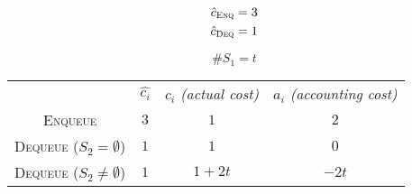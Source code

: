 \begin{frame}{}
  \centerline{}

  \begin{align*}
    \hat{c}_{\textsc{Enq}} &= 3 \\
    \hat{c}_{\textsc{Deq}} &= 1 \\
  \end{align*}

  \vspace{-0.60cm}
  \[
    \#S_1 = t
  \]

  \begin{table}
    \begin{tabular}{c|ccc}
      & $\hat{c_i}$ & $c_i$ {\it (actual cost)} & $a_i$ {\it (accounting cost)} \\
      \textsc{Enqueue} & $3$ & $1$ & $2$ \\
      \textsc{Dequeue} ($S_2 = \emptyset$) & $1$ & $1$ & $0$ \\
      \textsc{Dequeue} ($S_2 \neq \emptyset$) & $1$ & $1+2t$ & $-2t$
    \end{tabular}
  \end{table}
\end{frame}


